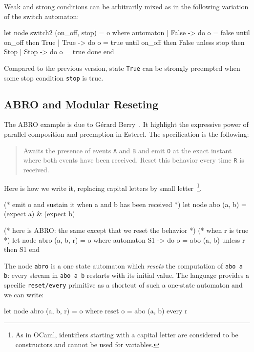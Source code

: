 \documentclass[11pt,titlepage,twoside]{report}
\newcommand{\ocaml}{{\sf OCaml}}
\begin{document}
Weak and strong conditions can be arbitrarily mixed as in the
following variation of the switch automaton:
\begin{runverbatim}
let node switch2 (on_off, stop) = o where
  automaton
  | False -> do o = false until on_off then True
  | True -> do o = true until on_off then False unless stop then Stop
  | Stop -> do o = true done
  end
\end{runverbatim}

Compared to the previous version, state \verb-True- can be strongly
preempted when some stop condition \verb-stop- is true.

\subsection{ABRO and Modular Reseting}
The ABRO example is due to G\'erard Berry~\cite{esterel:primer99}. It
highlight the expressive power of parallel composition and preemption
in Esterel. The specification is the following:

\begin{quote}
Awaits the presence of events \verb-A- and \verb-B- and emit \verb-O-
at the exact instant where both events have been received.  Reset this
behavior every time \verb-R- is received.
\end{quote}
Here is how we write it, replacing capital letters by small
letter~\footnote{As in \ocaml, identifiers starting with a capital
  letter are considered to be constructors and cannot be used for
  variables.}.

\begin{runverbatim}
(* emit o and sustain it when a and b has been received *)
let node abo (a, b) = (expect a) & (expect b)

(* here is ABRO: the same except that we reset the behavior *)
(* when r is true *)
let node abro (a, b, r) = o where
  automaton
    S1 -> do o = abo (a, b) unless r then S1
  end
\end{runverbatim}

The node \verb-abro- is a one state automaton which {\em resets} the
computation of \verb-abo a b-: every stream in \verb-abo a b- restarts
with its initial value. The language provides a specific
\verb-reset/every- primitive as a shortcut of such a one-state
automaton and we can write:

\begin{runverbatim}
let node abro (a, b, r) = o where
  reset
    o = abo (a, b)
  every r
\end{runverbatim}
\end{document}
